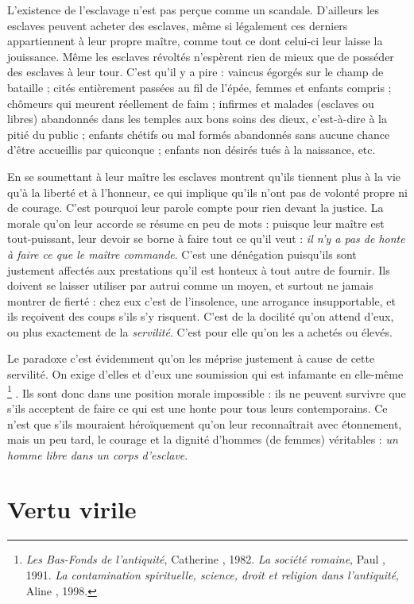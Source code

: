  L'existence de l'esclavage n'est pas perçue comme un scandale. D'ailleurs les esclaves peuvent acheter des esclaves, même si légalement ces derniers appartiennent à leur propre maître, comme tout ce dont celui-ci leur laisse la jouissance. Même les esclaves révoltés n'espèrent rien de mieux que de posséder des esclaves à leur tour. C'est qu'il y a pire : vaincus égorgés sur le champ de bataille ; cités entièrement passées au fil de l'épée, femmes et enfants compris ; chômeurs qui meurent réellement de faim ; infirmes et malades (esclaves ou libres) abandonnés dans les temples aux bons soins des dieux, c'est-à-dire à la pitié du public ; enfants chétifs ou mal formés abandonnés sans aucune chance d'être accueillis par quiconque ; enfants non désirés tués à la naissance, etc.

 En se soumettant à leur maître les esclaves montrent qu'ils tiennent plus à la vie qu'à la liberté et à l'honneur, ce qui implique qu'ils n'ont pas de volonté propre ni de courage. C'est pourquoi leur parole compte pour rien devant la justice. La morale qu'on leur accorde se résume en peu de mots : puisque leur maître est tout-puissant, leur devoir se borne à faire tout ce qu'il veut : \emph{il n'y a pas de honte à faire ce que le maître commande}. C'est une dénégation puisqu'ils sont justement affectés aux prestations qu'il est honteux à tout autre de fournir. Ils doivent se laisser utiliser par autrui comme un moyen, et surtout ne jamais montrer de fierté : chez eux c'est de l'insolence, une arrogance insupportable, et ils reçoivent des coups s'ils s'y risquent. C'est de la docilité qu'on attend d'eux, ou plus exactement de la \emph{servilité}. C'est pour elle qu'on les a achetés ou élevés. 

 Le paradoxe c'est évidemment qu'on les méprise justement à cause de cette servilité. On exige d'elles et d'eux une soumission qui est infamante en elle-même%
\footnote{\emph{Les Bas-Fonds de l'antiquité}, Catherine , 1982. \emph{La société romaine}, Paul , 1991. \emph{La contamination spirituelle, science, droit et religion dans l'antiquité}, Aline , 1998.}%
. Ils sont donc dans une position morale impossible : ils ne peuvent survivre que s'ils acceptent de faire ce qui est une honte pour tous leurs contemporains. Ce n'est que s'ils mouraient héroïquement qu'on leur reconnaîtrait avec étonnement, mais un peu tard, le courage et la dignité d'hommes (de femmes) véritables : \emph{un homme libre dans un corps d'esclave}. 


\section{Vertu virile}

